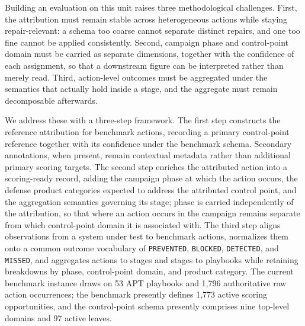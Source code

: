 Building an evaluation on this unit raises three methodological challenges. First, the
attribution must remain stable across heterogeneous actions while staying repair-relevant: a
schema too coarse cannot separate distinct repairs, and one too fine cannot be applied
consistently. Second, campaign phase and control-point domain must be carried as separate
dimensions, together with the confidence of each assignment, so that a
downstream figure can be interpreted rather than merely read. Third, action-level outcomes
must be aggregated under the semantics that actually hold inside a stage, and the aggregate
must remain decomposable afterwards.

We address these with a three-step framework. The first step constructs the reference
attribution for benchmark actions, recording a primary control-point reference together with
its confidence under the benchmark schema. Secondary annotations, when present, remain
contextual metadata rather than additional primary scoring targets. The second step enriches
the attributed action into a scoring-ready record, adding the campaign phase at which the
action occurs, the defense product categories expected to address the attributed control
point, and the aggregation semantics governing its stage; phase is carried independently of
the attribution, so that where an action occurs in the campaign remains separate from which
control-point domain it is associated with. The third step aligns observations from a system
under test to benchmark actions, normalizes them onto a common outcome vocabulary of
\texttt{PREVENTED}, \texttt{BLOCKED}, \texttt{DETECTED}, and \texttt{MISSED}, and aggregates
actions to stages and stages to playbooks while retaining breakdowns by phase, control-point
domain, and product category. The current benchmark instance draws on 53 APT playbooks and
1,796 authoritative raw action occurrences; the benchmark presently defines 1,773 active
scoring opportunities, and the control-point schema presently comprises nine top-level domains
and 97 active leaves.

